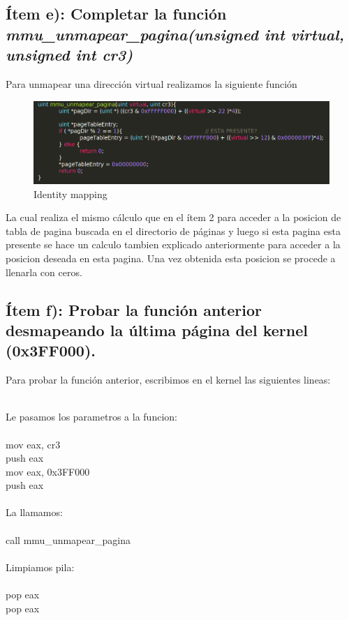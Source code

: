 \subsection{Ítem e): Completar la función \textit{mmu\_unmapear\_pagina(unsigned int virtual, unsigned int cr3)}}

	Para unmapear una dirección virtual realizamos la siguiente función 

	  \begin{figure}[H]
	  \begin{center}
  	  \includegraphics[width=\linewidth]{ejercicio3/unmap.png}
  	  \caption{{\small Identity mapping}}
	  \endminipage
	  \end{center}
	  \end{figure}

	La cual realiza el mismo cálculo que en el ítem 2 para acceder a la posicion de tabla de pagina buscada en el directorio de páginas y luego si esta pagina esta presente se hace un calculo tambien explicado anteriormente para acceder a la posicion deseada en esta pagina. Una vez obtenida esta posicion se procede a llenarla con ceros.


\subsection{Ítem f): Probar la función anterior desmapeando la última página del kernel (0x3FF000).} 

	 Para probar la función anterior, escribimos en el kernel las siguientes lineas:
	 \begin{center}

	 $~$  \\ 
	 Le pasamos los parametros a la funcion: \\
	 $~$  \\ 
	 mov eax, cr3 $~~~~~~~~$\\
   	 push eax$~~~~~~~~~~~~~~$ \\
   	 mov eax, 0x3FF000 \\
   	 push eax $~~~~~~~~~~~~~$\\

   	 $~$  \\ 
   	 La llamamos:\\
   	 $~$  \\ 
   	 call mmu\_unmapear\_pagina \\

   	 $~$  \\ 
   	 Limpiamos pila:\\
             $~$  \\ 
  	 pop eax \\
  	 pop eax \\
	 \end{center}

